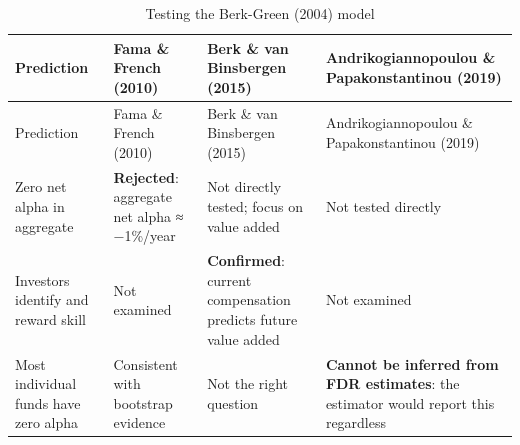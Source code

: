\documentclass[
  letterpaper,
  DIV=11,
  numbers=noendperiod]{scrartcl}
\begin{document}
\begin{longtable}[]{@{}
  >{\raggedright\arraybackslash}p{}
  >{\raggedright\arraybackslash}p{}
  >{\raggedright\arraybackslash}p{}
  >{\raggedright\arraybackslash}p{}@{}}
\caption{Testing the Berk-Green (2004) model}\tabularnewline
\toprule\noalign{}
\begin{minipage}[b]{\linewidth}\raggedright
Prediction
\end{minipage} & \begin{minipage}[b]{\linewidth}\raggedright
Fama \& French (2010)
\end{minipage} & \begin{minipage}[b]{\linewidth}\raggedright
Berk \& van Binsbergen (2015)
\end{minipage} & \begin{minipage}[b]{\linewidth}\raggedright
Andrikogiannopoulou \& Papakonstantinou (2019)
\end{minipage} \\
\midrule\noalign{}
\endfirsthead
\toprule\noalign{}
\begin{minipage}[b]{\linewidth}\raggedright
Prediction
\end{minipage} & \begin{minipage}[b]{\linewidth}\raggedright
Fama \& French (2010)
\end{minipage} & \begin{minipage}[b]{\linewidth}\raggedright
Berk \& van Binsbergen (2015)
\end{minipage} & \begin{minipage}[b]{\linewidth}\raggedright
Andrikogiannopoulou \& Papakonstantinou (2019)
\end{minipage} \\
\midrule\noalign{}
\endhead
\bottomrule\noalign{}
\endlastfoot
Zero net alpha in aggregate & \textbf{Rejected}: aggregate net alpha ≈
−1\%/year & Not directly tested; focus on value added & Not tested
directly \\
Investors identify and reward skill & Not examined & \textbf{Confirmed}:
current compensation predicts future value added & Not examined \\
Most individual funds have zero alpha & Consistent with bootstrap
evidence & Not the right question & \textbf{Cannot be inferred from FDR
estimates}: the estimator would report this regardless \\
\end{longtable}
\end{document}
